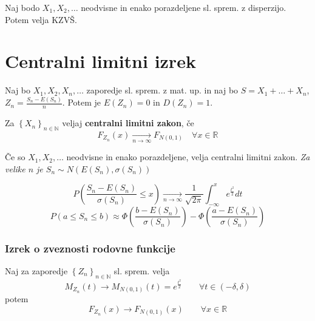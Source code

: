 \begin{multicols}{5}
Naj bodo  $X_1, X_2, \dots$ neodvisne in enako porazdeljene sl. sprem. z disperzijo. Potem velja KZVŠ.

\section{Centralni limitni izrek}
Naj bo $X_1, X_2, X_n, \dots$ zaporedje sl. sprem. z mat. up. in naj bo $S = X_1 +\dots + X_n$, $Z_n = \frac{S_n - E(S_n)}{n}$. Potem je $E(Z_n) = 0$ in $D(Z_n) = 1$.

Za $\left\{ X_n \right\}_{n \in \mathbb{N}} $ veljaj \textbf{centralni limitni zakon}, če
\[ F_{Z_n}(x) \xrightarrow[n \to \infty]{} F_{N(0,1)}  \quad \forall x \in \mathbb{R}\]

Če so $X_1, X_2, \dots$ neodvisne in enako porazdeljene, velja centralni limitni zakon.
\textit{Za velike $n$ je $S_n \sim N(E(S_n), \sigma(S_n))$}

\[ P\left(\frac{S_n - E(S_n)}{\sigma(S_n)} \leq x \right) \xrightarrow[n \to \infty]{} \frac{1}{\sqrt{2\pi}} \int_{-\infty}^{x} e^{\frac{t^2}{2}} dt\]
\[ P(a \leq S_n \leq b) \approx \Phi\left(\frac{b-E(S_n)}{\sigma(S_n)}\right) - \Phi\left(\frac{a-E(S_n)}{\sigma(S_n)}\right)  \]


\subsubsection{Izrek o zveznosti rodovne funkcije}

Naj za zaporedje $\left\{ Z_n \right\}_{n \in \mathbb{N}} $ sl. sprem. velja
\[ M_{Z_n}(t) \to M_{N(0,1)}(t) = e^{\frac{t^2}{2}} \qquad \forall t \in (-\delta, \delta)\]
potem
\[ F_{Z_n}(x) \to F_{N(0,1)}(x)  \qquad \forall x \in \mathbb{R}\]
\end{multicols}
